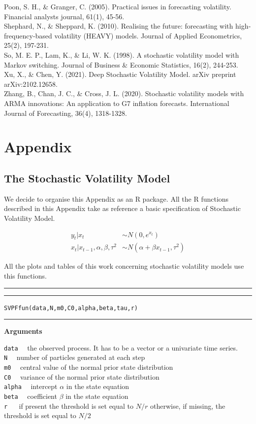 \documentclass[
]{book}
\theoremstyle{break}
\theoremstyle{nonumberplain}
\begin{document}
Poon, S. H., \& Granger, C. (2005). Practical issues in forecasting
volatility. Financial analysts journal, 61(1), 45-56.\\

Shephard, N., \& Sheppard, K. (2010). Realising the future: forecasting
with high‐frequency‐based volatility (HEAVY) models. Journal of Applied
Econometrics, 25(2), 197-231.\\

So, M. E. P., Lam, K., \& Li, W. K. (1998). A stochastic volatility
model with Markov switching. Journal of Business \& Economic Statistics,
16(2), 244-253.\\

Xu, X., \& Chen, Y. (2021). Deep Stochastic Volatility Model. arXiv
preprint arXiv:2102.12658.\\

Zhang, B., Chan, J. C., \& Cross, J. L. (2020). Stochastic volatility
models with ARMA innovations: An application to G7 inflation forecasts.
International Journal of Forecasting, 36(4), 1318-1328.

\chapter{Appendix}

\section{The Stochastic Volatility Model}

We decide to organise this Appendix as an R package. All the R functions
described in this Appendix take as reference a basic specification of
Stochastic Volatility Model.

\begin{align*}
    y_t|x_t & \sim N(0,e^{x_t})\\
    x_t|x_{t-1},\alpha,\beta,\tau^2 & \sim N(\alpha+\beta x_{t-1},\tau^2)
\end{align*}

All the plots and tables of this work concerning stochastic volatility
models use this functions.

\hrule
\hrule

\hfill\break
\texttt{SVPFfun(data,N,m0,C0,alpha,beta,tau,r)}\\

\hrule

\textbf{Arguments}

\texttt{data} ~~the observed process. It has to be a vector or a
univariate time series.\\
\texttt{N} ~~number of particles generated at each step\\
\texttt{m0} ~~central value of the normal prior state distribution\\
\texttt{C0} ~~variance of the normal prior state distribution\\
\texttt{alpha} ~~intercept \(\alpha\) in the state equation\\
\texttt{beta} ~~coefficient \(\beta\) in the state equation\\
\texttt{r} ~~ if present the threshold is set equal to \(N/r\)
otherwise, if missing, the threshold is set equal to \(N/2\)
\end{document}
